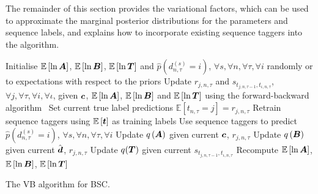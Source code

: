 The remainder of this section provides the variational factors,
which can be used to approximate the marginal posterior distributions for the parameters and sequence
labels,
and explains how to incorporate existing sequence taggers into the algorithm.
\begin{algorithm}
\DontPrintSemicolon
 \nl Initialise $\mathbb{E}\left[\ln \boldsymbol A \right]$,
 $\mathbb{E}\left[\ln \boldsymbol B \right]$, $\mathbb{E}\left[\ln \boldsymbol T \right]$ 
 and $\hat{p}(d^{(s)}_{n,\tau}=i)$, $\forall s,\forall n,\forall \tau,\forall i$
  randomly or to expectations with respect to the priors\;
 {
 \nl Update $r_{j,n,\tau}$ and $s_{t_{j,n,\tau-1}, t_{\iota,n,\tau}}$, $\forall j,\forall \tau,\forall i,\forall \iota$,
 given $\boldsymbol c$, 
 $\mathbb{E}\left[\ln \boldsymbol A \right]$, $\mathbb{E}\left[\ln \boldsymbol B \right]$ and $\mathbb{E}\left[\ln \boldsymbol T \right]$
 using the forward-backward algorithm~\cite{ghahramani2001introduction}\;
 \nl Set current true label predictions $\mathbb{E}\left[t_{n,\tau}=j\right] = r_{j,n,\tau}$ \;
 \nl Retrain sequence taggers using $\mathbb{E}\left[\boldsymbol t\right]$ as training labels\;
 \nl Use sequence taggers to predict $\hat{p}(d^{(s)}_{n,\tau}=i)$, $\forall s,\forall n,\forall \tau,\forall i$\;
 \nl Update $q\left(\boldsymbol A\right)$ given current $\boldsymbol c$, $r_{j,n,\tau}$\;
 \nl Update $q\left(\boldsymbol B\right)$ given current $\hat{\boldsymbol d}$, $r_{j,n,\tau}$\;
 \nl Update $q(\boldsymbol T)$ given current $s_{t_{j,n,\tau-1}, t_{\iota,n,\tau}}$\;
 \nl Recompute $\mathbb{E}\left[\ln \boldsymbol A \right]$, $\mathbb{E}\left[\ln \boldsymbol B \right]$, $\mathbb{E}\left[\ln\boldsymbol T \right]$ 
 }
\;
\caption{The VB algorithm for BSC.}
\label{al:vb_bac}
\end{algorithm}

